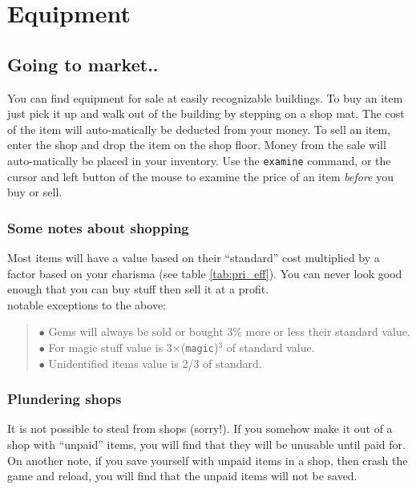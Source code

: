 
\chapter{Equipment}\label{chap:equip}

\section{Going to market..}

You can find equipment for sale at easily recognizable buildings. To buy an
item just pick it up and walk out of the building by stepping on a 
shop mat. The cost of the item will auto-matically be
deducted from your money. To sell an item, 
enter the shop and drop the item
on the shop floor. Money from the sale will auto-matically be placed in your
inventory. Use the {\tt examine} command, or the cursor and left button
of the mouse to examine the price of an item {\em before} you buy or sell. 
 
\subsection{Some notes about shopping}
 
Most items will have a value based on their ``standard'' cost
multiplied by a factor based on your charisma (see table \ref{tab:pri_eff}). 
You can never look good enough that you can buy stuff then sell
it at a profit. \\ 

 notable exceptions to the above:
\begin{quote} 
   $\bullet$ Gems will always be sold or bought 3\% more or less their standard value. \\ 
   $\bullet$ For magic stuff value is 3$\times$({\tt magic})$^{3}$ of standard value. \\ 
   $\bullet$ Unidentified items value is 2/3 of standard. 
\end{quote}
 
\subsection{Plundering shops}

It is not possible to steal from shops (sorry!). If you somehow make
it out of a shop with ``unpaid'' items, you will find that they will
be unusable until paid for. On another note, if you save yourself with
unpaid items in a shop, then crash the game and reload, you will 
find that the unpaid items will not be saved.
 
